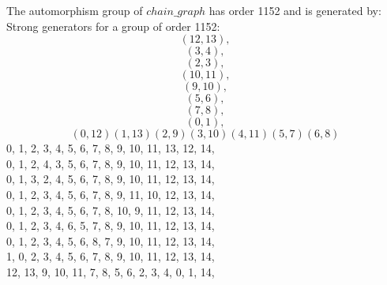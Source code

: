 \noindent The automorphism group of $chain\_graph$ has order 1152 and is generated by:\\
Strong generators for a group of order 1152:
$$
(12, 13), 
$$
$$
(3, 4), 
$$
$$
(2, 3), 
$$
$$
(10, 11), 
$$
$$
(9, 10), 
$$
$$
(5, 6), 
$$
$$
(7, 8), 
$$
$$
(0, 1), 
$$
$$
(0, 12)(1, 13)(2, 9)(3, 10)(4, 11)(5, 7)(6, 8)$$
0, 1, 2, 3, 4, 5, 6, 7, 8, 9, 10, 11, 13, 12, 14, \\
0, 1, 2, 4, 3, 5, 6, 7, 8, 9, 10, 11, 12, 13, 14, \\
0, 1, 3, 2, 4, 5, 6, 7, 8, 9, 10, 11, 12, 13, 14, \\
0, 1, 2, 3, 4, 5, 6, 7, 8, 9, 11, 10, 12, 13, 14, \\
0, 1, 2, 3, 4, 5, 6, 7, 8, 10, 9, 11, 12, 13, 14, \\
0, 1, 2, 3, 4, 6, 5, 7, 8, 9, 10, 11, 12, 13, 14, \\
0, 1, 2, 3, 4, 5, 6, 8, 7, 9, 10, 11, 12, 13, 14, \\
1, 0, 2, 3, 4, 5, 6, 7, 8, 9, 10, 11, 12, 13, 14, \\
12, 13, 9, 10, 11, 7, 8, 5, 6, 2, 3, 4, 0, 1, 14, \\


